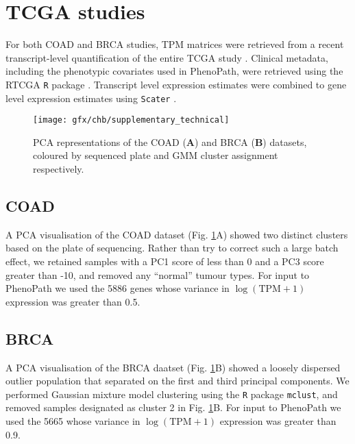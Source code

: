 \section{TCGA studies}

For both COAD and BRCA studies, TPM matrices were retrieved from a recent transcript-level quantification of the entire TCGA study \cite{Tatlow2016-yo}. Clinical metadata, including the phenotypic covariates used in PhenoPath, were retrieved using the RTCGA \texttt{R} package \cite{rtcga}. Transcript level expression estimates were combined to gene level expression estimates using \texttt{Scater} \cite{McCarthy2017-we}.


\begin{figure}
  \centering
\texttt{[image: gfx/chb/supplementary\_technical]}
\caption{PCA representations of the COAD (\textbf{A}) and BRCA (\textbf{B}) datasets, coloured by sequenced plate and GMM cluster assignment respectively.} \label{fig:technical}
\end{figure}

\subsection{COAD}

A PCA visualisation of the COAD dataset (Fig. \ref{fig:technical}A) showed two distinct clusters based on the plate of sequencing. Rather than try to correct such a large batch effect, we retained samples with a PC1 score of less than 0 and a PC3 score greater than -10, and removed any ``normal'' tumour types. For input to PhenoPath we used the 5886 genes whose variance in $\log(\text{TPM} + 1)$ expression was greater than 0.5.

\subsection{BRCA}

A PCA visualisation of the BRCA daatset (Fig. \ref{fig:technical}B) showed a loosely dispersed outlier population that separated on the first and third principal components. We performed Gaussian mixture model clustering using the \texttt{R} package \texttt{mclust}\cite{Fraley_undated-ug}, and removed samples designated as cluster 2 in Fig. \ref{fig:technical}B. For input to PhenoPath we used the 5665 whose variance in $\log(\text{TPM} + 1)$ expression was greater than 0.9.

